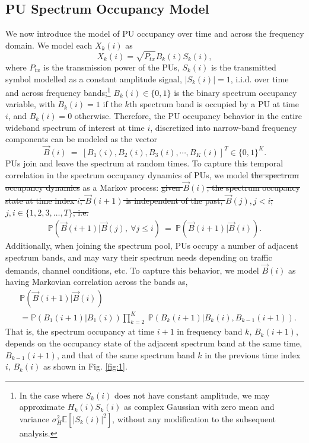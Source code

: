 \documentclass[10pt,twocolumn]{IEEEtran}
\newcommand{\sst}[1]{\st{#1}}
\newcommand{\add}[1]{{\color{red}{#1}}}
\begin{document}
\subsection{PU Spectrum Occupancy Model}
We now introduce the model of PU occupancy over time and across the frequency domain. We model each $X_k(i)$ as 
\begin{equation}\label{4}
    X_k(i)=\sqrt{P_{tx}}B_k(i)S_k(i),
\end{equation}
where $P_{tx}$ is the transmission power of the PUs, $S_k(i)$ is the transmitted symbol modelled as a constant amplitude signal, $|S_k(i)|{=}1$, i.i.d. over time and across frequency bands;\footnote{In the case where $S_k(i)$ does not have constant amplitude, we may approximate $H_{k}(i)S_{k}(i)$ as complex Gaussian with zero mean and variance $\sigma_H^2\mathbb E[|S_{k}(i)|^2]$, without any modification to the subsequent analysis.} $B_k(i){\in}\{0,1\}$ is the binary spectrum occupancy variable, with $B_k(i){=}1$ if the $k$th spectrum band is occupied by a PU at time $i$, and $B_k(i){=}0$ otherwise. Therefore, the PU occupancy behavior in the entire wideband spectrum of interest at time $i$, discretized into narrow-band frequency components can be modeled as the vector 
\begin{equation}\label{5}
    \vec{B}(i)\ =\ [B_1(i),B_2(i),B_3(i),\cdots,B_K(i)]^T \in \{0,1\}^K.
\end{equation}
PUs join and leave the spectrum at random times. To capture this temporal correlation in the spectrum occupancy dynamics of PUs, we model \add{$\vec{B}(i)$}\sst{ the spectrum occupancy dynamics} as a Markov process:\sst{ given $\vec{B}(i)$, the spectrum occupancy state at time index $i$, $\vec{B}(i+1)$ is independent of the past, $\vec{B}(j), j < i$; $j, i \in \{1,2,3,\dots,T\}$, i.e. }
\begin{equation}\label{6}
    \begin{aligned}
        \mathbb{P}(\vec{B}(i+1)|\vec{B}(j),\ \forall j \leq i)\ =\ \mathbb{P}(\vec{B}(i+1)|\vec{B}(i)).
    \end{aligned}
\end{equation}
Additionally, when joining the spectrum pool, PUs occupy a number of adjacent spectrum bands, and may vary their spectrum needs depending on traffic demands, channel conditions, etc. To capture this behavior, we model $\vec{B}(i)$ as having Markovian correlation across the bands as, 
\begin{align}\label{7}
&         \mathbb{P}(\vec{B}(i+1)|\vec{B}(i))\\&=
\nonumber
         \mathbb{P}(B_{1}(i+1)|B_{1}(i))
         \prod_{k=2}^{K}\ \mathbb{P}(B_{k}(i+1)|B_{k}(i),B_{k-1}(i+1)).
\end{align}
That is, the spectrum occupancy at time $i+1$ in frequency band $k$, $B_{k}(i+1)$, depends on the  occupancy state of the adjacent spectrum band at the same time, $B_{k-1}(i+1)$, and that of the same spectrum band $k$ in the previous time index $i$, $B_{k}(i)$ as shown in Fig. \ref{fig:1}.
\end{document}
